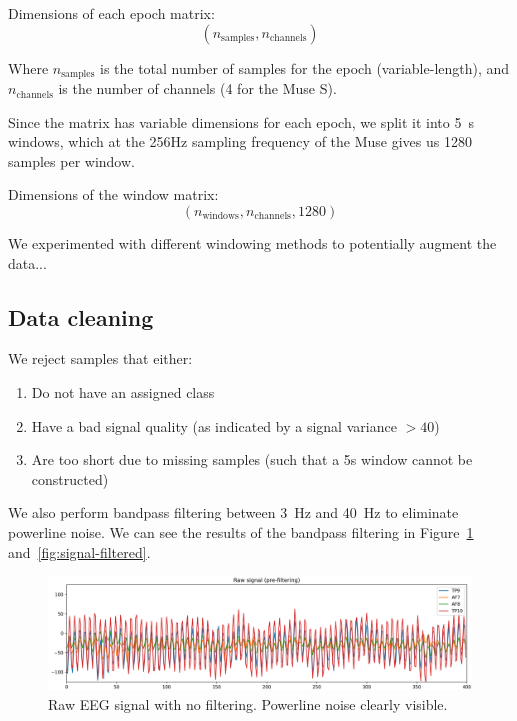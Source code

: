         Dimensions of each epoch matrix: \[ (n_{\mathrm{samples}}, n_{\mathrm{channels}}) \]

        Where $n_{\mathrm{samples}}$ is the total number of samples for the epoch (variable-length), and $n_{\mathrm{channels}}$ is the number of channels (4 for the Muse S).

        Since the matrix has variable dimensions for each epoch, we split it into \SI{5}{\second} windows, which at the 256Hz sampling frequency of the Muse gives us 1280 samples per window.

        Dimensions of the window matrix: \[ (n_{\mathrm{windows}}, n_{\mathrm{channels}}, 1280) \]

        We experimented with different windowing methods to potentially augment the data...  

    \subsection{Data cleaning}

        We reject samples that either:

        \begin{enumerate}
            \item Do not have an assigned class
            \item Have a bad signal quality (as indicated by a signal variance $>40$)
            \item Are too short due to missing samples (such that a 5s window cannot be constructed)
        \end{enumerate}



        We also perform bandpass filtering between \SI{3}{\hertz} and \SI{40}{\hertz} to eliminate powerline noise. We can see the results of the bandpass filtering in Figure~\ref{fig:signal-unfiltered} and~\ref{fig:signal-filtered}.

        \begin{figure}[h]
            \includegraphics[width=14cm]{img/raw-signal-prefilter.png}
            \caption{Raw EEG signal with no filtering. Powerline noise clearly visible.}\label{fig:signal-unfiltered}
        \end{figure}

